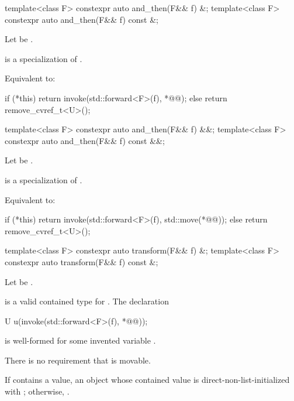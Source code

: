 \begin{itemdecl}
template<class F> constexpr auto and_then(F&& f) &;
template<class F> constexpr auto and_then(F&& f) const &;
\end{itemdecl}

\begin{itemdescr}
\pnum
Let  be .

\pnum
\mandates
{} is a specialization of .

\pnum
\effects
Equivalent to:
\begin{codeblock}
if (*this) {
  return invoke(std::forward<F>(f), *@@);
} else {
  return remove_cvref_t<U>();
}
\end{codeblock}
\end{itemdescr}

\begin{itemdecl}
template<class F> constexpr auto and_then(F&& f) &&;
template<class F> constexpr auto and_then(F&& f) const &&;
\end{itemdecl}

\begin{itemdescr}
\pnum
Let  be .

\pnum
\mandates
{} is a specialization of .

\pnum
\effects
Equivalent to:
\begin{codeblock}
if (*this) {
  return invoke(std::forward<F>(f), std::move(*@@));
} else {
  return remove_cvref_t<U>();
}
\end{codeblock}
\end{itemdescr}

\begin{itemdecl}
template<class F> constexpr auto transform(F&& f) &;
template<class F> constexpr auto transform(F&& f) const &;
\end{itemdecl}

\begin{itemdescr}
\pnum
Let  be .

\pnum
\mandates
{} is a valid contained type for .
The declaration
\begin{codeblock}
U u(invoke(std::forward<F>(f), *@@));
\end{codeblock}
is well-formed for some invented variable .
\begin{note}
There is no requirement that  is movable.
\end{note}

\pnum
\returns
If  contains a value, an  object
whose contained value is direct-non-list-initialized with
;
otherwise, .
\end{itemdescr}

